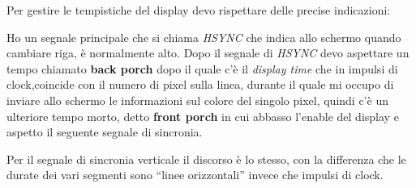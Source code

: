 Per gestire le tempistiche del display devo rispettare delle precise indicazioni:

Ho un segnale principale che si chiama \textit{HSYNC} che indica allo schermo quando cambiare riga, \`e normalmente alto. Dopo il segnale di \textit{HSYNC} devo aspettare un tempo chiamato \textbf{back porch} dopo il quale c'\`e il \textit{display time} che in impulsi di clock,coincide con il numero di pixel sulla linea, durante il quale mi occupo di inviare allo schermo le informazioni sul colore del singolo pixel, quindi c'\`e un ulteriore tempo morto, detto \textbf{front porch} in cui abbasso l'enable del display e aspetto il seguente segnale di sincronia.

Per il segnale di sincronia verticale il discorso \`e lo stesso, con la differenza che le durate dei vari segmenti sono ``linee orizzontali'' invece che impulsi di clock.
